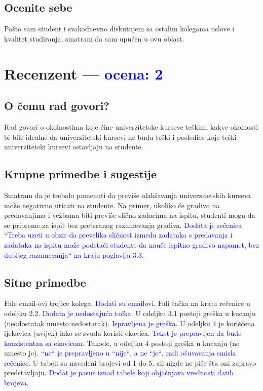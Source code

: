 \documentclass[a4paper]{report}
\newcommand{\odgovor}[1]{\textcolor{blue}{#1}}
\begin{document}
\section{Ocenite sebe}

Pošto sam student i svakodnevno diskutujem sa ostalim kolegama uslove i kvalitet studiranja, smatram da sam upućen u ovu oblast.


\chapter{Recenzent \odgovor{--- ocena: 2} }


\section{O čemu rad govori?}
Rad govori o okolnostima koje čine univerzitetske kurseve teškim, kakve okolnosti bi bile idealne da univerzitetski kursevi ne budu teški i posledice koje teški univerzitetski kursevi ostavljaju na studente.

\section{Krupne primedbe i sugestije}
Smatram da je trebalo pomenuti da previše olakšavanja univerzitetskih kurseva može negativno uticati na studente. Na primer, ukoliko će gradivo na predavanjima i vežbama biti previše slično zadacima na ispitu, studenti mogu da se pripreme za ispit bez preteranog razumevanja gradiva.
\odgovor{Dodata je rečenica ``Treba uzeti u obzir da prevelika
sličnost izmedu zadataka s predavanja i zadataka na ispitu može podstaći
studente da nauče ispitno gradivo napamet, bez dubljeg razumevanja`` na kraju poglavlja 3.3.}

\section{Sitne primedbe}
Fale email-ovi trojice kolega. \odgovor{Dodati su emailovi.} Fali tačka na kraju rečenice u odeljku 2.2. \odgovor{Dodata je nedostajuća tačka.} U odeljku 3.1 postoji greška u kucanju (neodostatak umesto nedostatak). \odgovor{Ispravljena je greška.} U odeljku 4 je korišćena ijekavica (uvijek) iako se svuda koristi ekavica. \odgovor{Tekst je prepravljen da bude konzistentan sa ekavicom.} Takođe, u odeljku 4 postoji greška u kucanju (ne umesto je). \odgovor{``ne`` je prepravljeno u ``nije``, a ne ``je``, radi očuvavanja smisla rečenice.} U tabeli su navedeni brojevi od 1 do 5, ali nigde ne piše šta oni zapravo predstavljaju. \odgovor{Dodat je pasus iznad tabele koji objašnjava vrednosti datih brojeva.}
\end{document}
